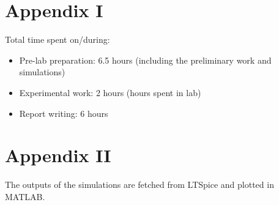 \documentclass[letterpaper,12pt]{article}
\begin{document}
\section*{Appendix I}
Total time spent on/during:
\begin{itemize}
	\item Pre-lab preparation: 6.5 hours (including the preliminary work and simulations) 
	\item Experimental work: 2 hours (hours spent in lab)
	\item Report writing: 6 hours 
\end{itemize}
\section*{Appendix II}
The outputs of the simulations are fetched from LTSpice and plotted in MATLAB.



\end{document}
